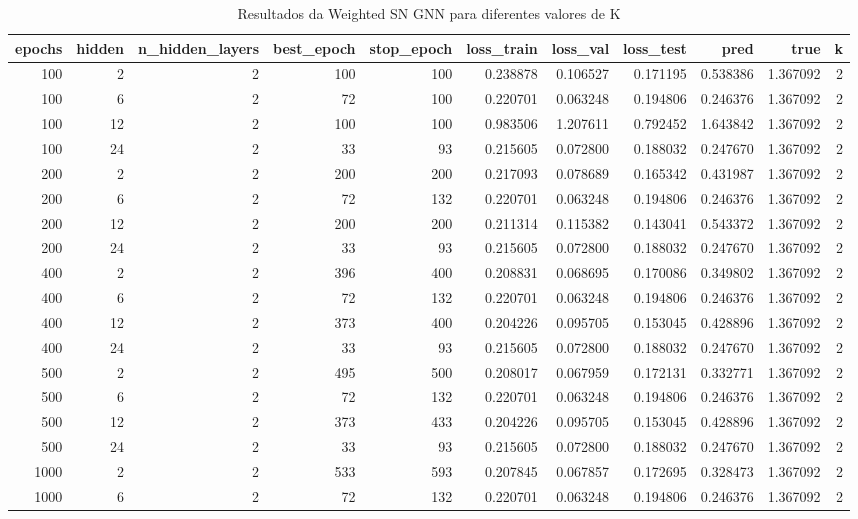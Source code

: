 \begin{table}
\caption{Resultados da Weighted SN GNN para diferentes valores de K}
\label{tab:weighted_gnn_results_all_k}
\begin{tabular}{rrrrrrrrrrr}
\toprule
epochs & hidden & n\_hidden\_layers & best\_epoch & stop\_epoch & loss\_train & loss\_val & loss\_test & pred & true & k \\
\midrule
100 & 2 & 2 & 100 & 100 & 0.238878 & 0.106527 & 0.171195 & 0.538386 & 1.367092 & 2 \\
100 & 6 & 2 & 72 & 100 & 0.220701 & 0.063248 & 0.194806 & 0.246376 & 1.367092 & 2 \\
100 & 12 & 2 & 100 & 100 & 0.983506 & 1.207611 & 0.792452 & 1.643842 & 1.367092 & 2 \\
100 & 24 & 2 & 33 & 93 & 0.215605 & 0.072800 & 0.188032 & 0.247670 & 1.367092 & 2 \\
200 & 2 & 2 & 200 & 200 & 0.217093 & 0.078689 & 0.165342 & 0.431987 & 1.367092 & 2 \\
200 & 6 & 2 & 72 & 132 & 0.220701 & 0.063248 & 0.194806 & 0.246376 & 1.367092 & 2 \\
200 & 12 & 2 & 200 & 200 & 0.211314 & 0.115382 & 0.143041 & 0.543372 & 1.367092 & 2 \\
200 & 24 & 2 & 33 & 93 & 0.215605 & 0.072800 & 0.188032 & 0.247670 & 1.367092 & 2 \\
400 & 2 & 2 & 396 & 400 & 0.208831 & 0.068695 & 0.170086 & 0.349802 & 1.367092 & 2 \\
400 & 6 & 2 & 72 & 132 & 0.220701 & 0.063248 & 0.194806 & 0.246376 & 1.367092 & 2 \\
400 & 12 & 2 & 373 & 400 & 0.204226 & 0.095705 & 0.153045 & 0.428896 & 1.367092 & 2 \\
400 & 24 & 2 & 33 & 93 & 0.215605 & 0.072800 & 0.188032 & 0.247670 & 1.367092 & 2 \\
500 & 2 & 2 & 495 & 500 & 0.208017 & 0.067959 & 0.172131 & 0.332771 & 1.367092 & 2 \\
500 & 6 & 2 & 72 & 132 & 0.220701 & 0.063248 & 0.194806 & 0.246376 & 1.367092 & 2 \\
500 & 12 & 2 & 373 & 433 & 0.204226 & 0.095705 & 0.153045 & 0.428896 & 1.367092 & 2 \\
500 & 24 & 2 & 33 & 93 & 0.215605 & 0.072800 & 0.188032 & 0.247670 & 1.367092 & 2 \\
1000 & 2 & 2 & 533 & 593 & 0.207845 & 0.067857 & 0.172695 & 0.328473 & 1.367092 & 2 \\
1000 & 6 & 2 & 72 & 132 & 0.220701 & 0.063248 & 0.194806 & 0.246376 & 1.367092 & 2 \\

\end{tabular}
\end{table}
